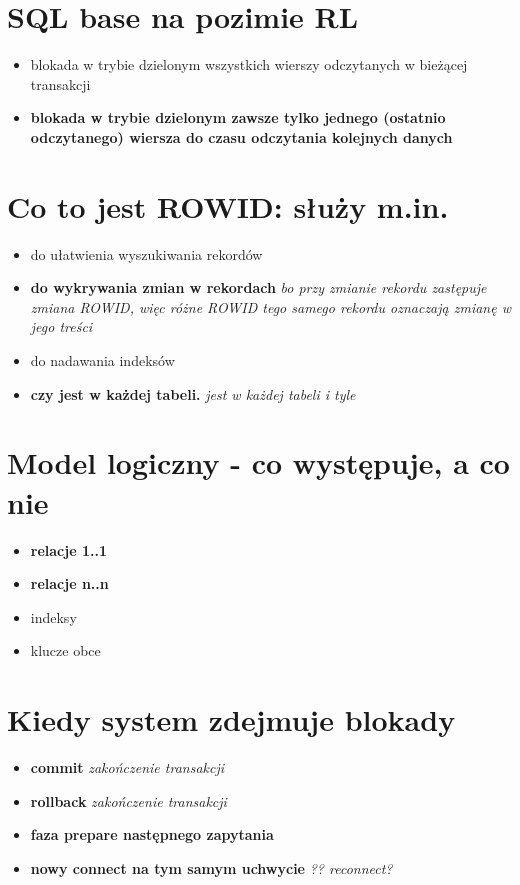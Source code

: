 \documentclass[a4paper,twoside]{article}
\begin{document}
  	\section{SQL base na pozimie RL}
  	\begin{itemize}
  		\item blokada w trybie dzielonym wszystkich wierszy odczytanych w bieżącej transakcji
  		\item \textbf{blokada w trybie dzielonym zawsze tylko jednego (ostatnio odczytanego) wiersza do czasu odczytania kolejnych danych}
  	\end{itemize}
  	
  	\section{Co to jest ROWID: służy m.in.}
  	\begin{itemize}
  		\item do ułatwienia wyszukiwania rekordów
  		\item \textbf{do wykrywania zmian w rekordach} \emph{bo przy zmianie rekordu zastępuje zmiana ROWID, więc różne ROWID tego samego rekordu oznaczają zmianę w jego treści}
  		\item  do nadawania indeksów 
  		\item \textbf{czy jest w każdej tabeli.} \emph{jest w każdej tabeli i tyle}
  	\end{itemize}
  	
  	\section{Model logiczny - co występuje, a co nie}
  	\begin{itemize}
  		\item \textbf{relacje 1..1}
  		\item \textbf{relacje n..n}
  		\item indeksy
  		\item klucze obce
  	\end{itemize}
  	
  	\section{Kiedy system zdejmuje blokady}
  	\begin{itemize}
  		\item \textbf{commit} \emph{zakończenie transakcji}
  		\item \textbf{rollback} \emph{zakończenie transakcji}
  		\item \textbf{faza prepare następnego zapytania}
  		\item \textbf{nowy connect na tym samym uchwycie} \emph{?? reconnect?}
  	\end{itemize}
  	
\end{document}
